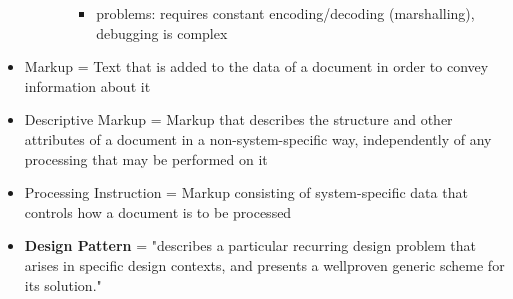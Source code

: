 \documentclass[11pt]{article}
\begin{document}
\begin{itemize}
\begin{itemize}
\begin{itemize}
\begin{itemize}
\item problems: requires constant encoding/decoding (marshalling), debugging is complex
\end{itemize}
\end{itemize}
\end{itemize}
\item Markup = Text that is added to the data of a document in order to convey information about it
\item Descriptive Markup = Markup that describes the structure and other attributes of a document in a non-system-specific way, independently of any processing that may be performed on it
\item Processing Instruction = Markup consisting of system-specific data that controls how a document is to be processed
\item \textbf{Design Pattern} = "describes a particular recurring design problem that arises in specific design contexts, and presents a wellproven generic scheme for its solution."
\end{itemize}
\end{document}
